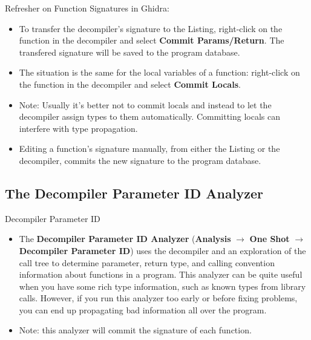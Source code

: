 \documentclass{beamer}
\begin{document}
\begin{frame}
\begin{block}{Refresher on Function Signatures in Ghidra:}
\begin{itemize}
\item To transfer the decompiler's signature to the Listing, right-click on the function in the decompiler and select \textbf{Commit Params/Return}. The transfered signature will be
saved to the program database.
\item The situation is the same for the local variables of a function: right-click on the function in the decompiler and select \textbf{Commit Locals}. 
\item[] Note: Usually it's better not to commit locals and instead to let the decompiler assign types to them automatically.  Committing locals can
interfere with type propagation.
\item Editing a function's signature manually, from either the Listing or the decompiler, commits the new signature to the program database.
\end{itemize}
\end{block}
\end{frame}

\subsection{The Decompiler Parameter ID Analyzer}
\begin{frame}
\begin{block}{Decompiler Parameter ID}
\begin{itemize}
\item The \textbf{Decompiler Parameter ID Analyzer} (\textbf{Analysis} $\rightarrow$ \textbf{One Shot} $\rightarrow$ \textbf{Decompiler Parameter ID}) uses the decompiler and an
exploration of the call tree to determine parameter, return type, and calling convention information about functions in a program.  This analyzer can be quite useful when 
you have some rich type information, such as known types from library calls.  However, if you run this analyzer too early or before fixing problems, you can end up propagating 
bad information all over the program.
\item Note: this analyzer will commit the signature of each function.
\end{itemize}
\end{block}
\end{frame}
\end{document}
